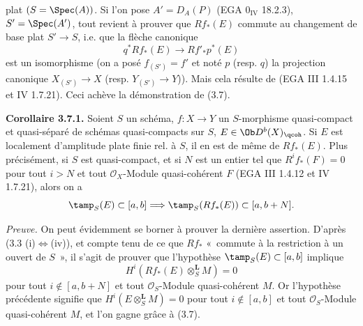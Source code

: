 plat \((S=\Spec(A))\). Si l'on pose \(A'=D_A(P)\) (EGA \(0_{\mathrm{IV}}\) 18.2.3), \(S'=\Spec(A')\), tout revient à prouver que \(Rf_*(E)\) commute au changement de base plat \(S'\to S\), i.e. que la flèche canonique
\[
 q^*Rf_*(E)\longrightarrow Rf'_*p^*(E)
\]
est un isomorphisme (on a posé \(f_{(S')}=f'\) et noté \(p\) (resp. \(q\)) la projection canonique \(X_{(S')}\longrightarrow X\) (resp. \(Y_{(S')}\longrightarrow Y\))). Mais cela résulte de (EGA III 1.4.15 et IV 1.7.21). Ceci achève la démonstration de (3.7).

\textbf{Corollaire 3.7.1.} Soient \(S\) un schéma, \(f:X\to Y\) un \(S\)-morphisme quasi-compact et quasi-séparé de schémas quasi-compacts sur \(S\), \(E\in\Ob D^b(X)_{\qcoh}\). Si \(E\) est localement d'amplitude plate finie rel. à \(S\), il en est de même de \(Rf_*(E)\). Plus précisément, si \(S\) est quasi-compact, et si \(N\) est un entier tel que \(R^if_*(F)=0\) pour tout \(i>N\) et tout \(\mathcal O_X\)-Module quasi-cohérent \(F\) (EGA III 1.4.12 et IV 1.7.21), alors on a
\[
 \tamp_S(E)\subset[a,b]
 \Longrightarrow
 \tamp_S(Rf_*(E))
 \subset[a,b+N].
\]

\emph{Preuve.} On peut évidemment se borner à prouver la dernière assertion. D'après (3.3 (i)\(\Longleftrightarrow\)(iv)), et compte tenu de ce que \(Rf_*\) «~commute à la restriction à un ouvert de \(S\)~», il s'agit de prouver que l'hypothèse \(\tamp_S(E)\subset[a,b]\) implique
\[
 H^i(Rf_*(E)\otimes_S^{\mathbf L}M)=0
\]
pour tout \(i\notin[a,b+N]\) et tout \(\mathcal O_S\)-Module quasi-cohérent \(M\). Or l'hypothèse précédente signifie que \(H^i(E\otimes_S^{\mathbf L}M)=0\) pour tout \(i\notin[a,b]\) et tout \(\mathcal O_S\)-Module quasi-cohérent \(M\), et l'on gagne grâce à (3.7).

